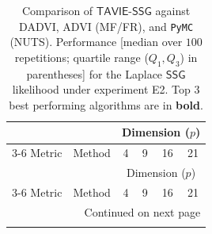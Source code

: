 \documentclass[12pt]{article}
\numberwithin{equation}{section}
\newcommand{\tssg}{\mathsf{TAVIE}\text{-}\mathsf{SSG}}
\begin{document}
{\scriptsize
\setlength{\tabcolsep}{3pt} %
\renewcommand{\arraystretch}{1.15}%
\begin{longtable}{llcccc}
\caption{\footnotesize{Comparison of $\tssg$ against DADVI, ADVI (MF/FR), and \texttt{PyMC} (NUTS). Performance [median over $100$ repetitions; quartile range ($Q_1, Q_3$)  in parentheses] for the Laplace $\mathsf{SSG}$ likelihood under experiment E2. { Top $3$ best performing algorithms are in \textbf{bold}.}}} 
\label{tab:laplace_singlen_multip}\\
\toprule
\toprule
 &  & \multicolumn{4}{c}{Dimension ($p$)} \\
\cmidrule(lr){3-6}
Metric & Method & 4 & 9 & 16 & 21 \\
\midrule
\endfirsthead
\toprule
 &  & \multicolumn{4}{c}{Dimension ($p$)} \\
\cmidrule(lr){3-6}
Metric & Method & 4 & 9 & 16 & 21 \\
\midrule
\endhead
\midrule
\multicolumn{6}{r}{Continued on next page} \\
\midrule
\endfoot
\bottomrule
\endlastfoot


\end{longtable}}
\end{document}
